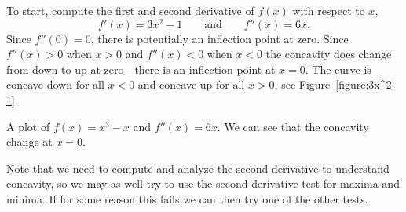 \begin{solution}
To start, compute the first and second derivative of $f(x)$ with
respect to $x$,
\[
f'(x)=3x^2-1\qquad\text{and}\qquad f''(x)=6x.
\]
Since $f''(0)=0$, there is potentially an inflection point at
zero. Since $f''(x)>0$ when $x>0$ and $f''(x)<0$ when $x<0$ the
concavity does change from down to up at zero---there is an inflection
point at $x=0$. The curve is concave down for all $x<0$ and
concave up for all $x>0$, see Figure~\ref{figure:3x^2-1}.
\end{solution}
\begin{marginfigure}[0in]
\caption{A plot of $f(x) = x^3-x$ and $f''(x) = 6x$. We can see that
  the concavity change at $x=0$.}
\label{figure:3x^2-1}
\end{marginfigure}

Note that we need to compute and analyze the second derivative to
understand concavity, so we may as well try to use the second
derivative test for maxima and minima. If for some reason this fails
we can then try one of the other tests.

